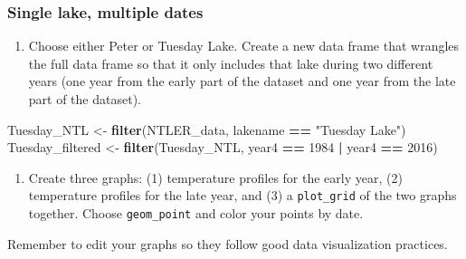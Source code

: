 \documentclass[]{article}
\newenvironment{Shaded}{\begin{snugshade}}{\end{snugshade}}
\newcommand{\DecValTok}[1]{\textcolor[rgb]{0.00,0.00,0.81}{#1}}
\newcommand{\KeywordTok}[1]{\textcolor[rgb]{0.13,0.29,0.53}{\textbf{#1}}}
\newcommand{\NormalTok}[1]{#1}
\newcommand{\OperatorTok}[1]{\textcolor[rgb]{0.81,0.36,0.00}{\textbf{#1}}}
\newcommand{\StringTok}[1]{\textcolor[rgb]{0.31,0.60,0.02}{#1}}
\providecommand{\tightlist}{%
  \setlength{\itemsep}{0pt}\setlength{\parskip}{0pt}}
\begin{document}
\hypertarget{single-lake-multiple-dates}{%
\subsubsection{Single lake, multiple
dates}\label{single-lake-multiple-dates}}

\begin{enumerate}
\def\labelenumi{\arabic{enumi}.}
\setcounter{enumi}{4}
\tightlist
\item
  Choose either Peter or Tuesday Lake. Create a new data frame that
  wrangles the full data frame so that it only includes that lake during
  two different years (one year from the early part of the dataset and
  one year from the late part of the dataset).
\end{enumerate}

\begin{Shaded}
\begin{Highlighting}[]
\NormalTok{Tuesday_NTL <-}\StringTok{ }\KeywordTok{filter}\NormalTok{(NTLER_data, lakename }\OperatorTok{==}\StringTok{ "Tuesday Lake"}\NormalTok{)}
\NormalTok{Tuesday_filtered <-}\StringTok{ }\KeywordTok{filter}\NormalTok{(Tuesday_NTL, year4 }\OperatorTok{==}\StringTok{ }\DecValTok{1984} \OperatorTok{|}\StringTok{ }\NormalTok{year4 }\OperatorTok{==}\StringTok{ }\DecValTok{2016}\NormalTok{)}
\end{Highlighting}
\end{Shaded}

\begin{enumerate}
\def\labelenumi{\arabic{enumi}.}
\setcounter{enumi}{5}
\tightlist
\item
  Create three graphs: (1) temperature profiles for the early year, (2)
  temperature profiles for the late year, and (3) a \texttt{plot\_grid}
  of the two graphs together. Choose \texttt{geom\_point} and color your
  points by date.
\end{enumerate}

Remember to edit your graphs so they follow good data visualization
practices.
\end{document}
